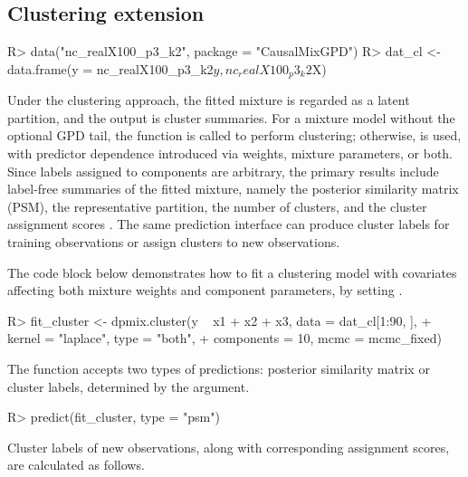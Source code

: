 \documentclass[article]{jss}\usepackage[]{graphicx}\usepackage[]{xcolor}
\renewenvironment{Schunk}{\vspace{0pt}}{\vspace{-0.1\baselineskip}}
\begin{document}
\subsection{Clustering extension}
\label{subsec:cluster_extension}

\begin{Schunk}
\begin{Sinput}
R> data("nc_realX100_p3_k2", package = "CausalMixGPD")
R> dat_cl <- data.frame(y = nc_realX100_p3_k2$y, nc_realX100_p3_k2$X)
\end{Sinput}
\end{Schunk}
Under the clustering approach, the fitted mixture is regarded as a latent partition, and the output is cluster summaries.  For a mixture model without the optional GPD tail, the function  is called to perform clustering; otherwise,  is used, with predictor dependence introduced via weights, mixture parameters, or both.  Since labels assigned to components are arbitrary, the primary results include label-free summaries of the fitted mixture, namely the posterior similarity matrix (PSM), the representative partition, the number of clusters, and the cluster assignment scores
\citep{Binder1978,Dahl2006}.  The same prediction interface  can produce cluster labels for training observations or assign clusters to new observations.

The code block below demonstrates how to fit a clustering model with covariates affecting both mixture weights and component parameters, by setting .

\begin{Schunk}
\begin{Sinput}
R> fit_cluster <- dpmix.cluster(y ~ x1 + x2 + x3, data = dat_cl[1:90, ],
+                          kernel = "laplace", type = "both",
+                           components = 10,  mcmc = mcmc_fixed)
\end{Sinput}
\end{Schunk}

The function  accepts two types of predictions: posterior similarity matrix or cluster labels, determined by the  argument.

\begin{Schunk}
\begin{Sinput}
R> predict(fit_cluster, type = "psm")
\end{Sinput}
\end{Schunk}

Cluster labels of new observations, along with corresponding assignment scores, are calculated as follows.
\end{document}
